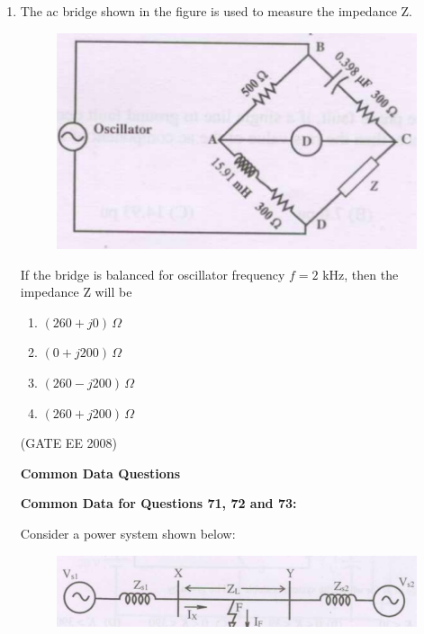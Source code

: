 \documentclass[journal,12pt,onecolumn]{IEEEtran}
\theoremstyle{remark}
\begin{document}
\begin{enumerate}[start=1, label=Q.\arabic*]
\item The ac bridge shown in the figure is used to measure the impedance Z.

\begin{figure}[H]
    \centering
    \includegraphics[width=\columnwidth]{Fig/q70.png}
\end{figure}

If the bridge is balanced for oscillator frequency $f=2$ kHz, then the impedance Z will be

\begin{multicols}{4}
\begin{enumerate}[label=(\Alph*)]
    \item $(260 + j0)\,\Omega$
    \item $(0 + j200)\,\Omega$
    \item $(260 - j200)\,\Omega$
    \item $(260 + j200)\,\Omega$
\end{enumerate}
\end{multicols}
\hfill (GATE EE 2008)


\begin{center}
\textbf{Common Data Questions}
\end{center}

\textbf{Common Data for Questions 71, 72 and 73:}

Consider a power system shown below:

\begin{figure}[H]
    \centering
    \includegraphics[width=\columnwidth]{Fig/comp1.png}
\end{figure}


\end{enumerate}
\end{document}
